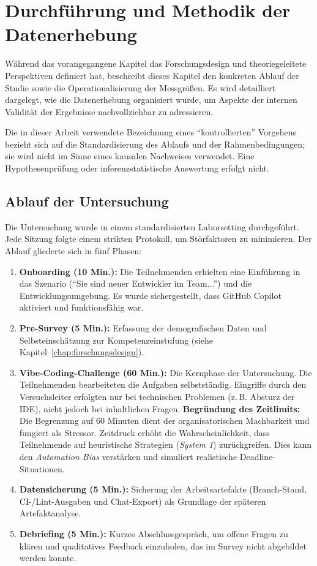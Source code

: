 \chapter{Durchführung und Methodik der Datenerhebung}
\label{chap:methodik}

Während das vorangegangene Kapitel das Forschungsdesign und theoriegeleitete Perspektiven definiert hat, beschreibt dieses Kapitel den konkreten Ablauf der Studie sowie die Operationalisierung der Messgrößen. Es wird detailliert dargelegt, wie die Datenerhebung organisiert wurde, um Aspekte der internen Validität der Ergebnisse nachvollziehbar zu adressieren.

Die in dieser Arbeit verwendete Bezeichnung eines \enquote{kontrollierten} Vorgehens bezieht sich auf die Standardisierung des Ablaufs und der Rahmenbedingungen; sie wird nicht im Sinne eines kausalen Nachweises verwendet. Eine Hypothesenprüfung oder inferenzstatistische Auswertung erfolgt nicht.

\section{Ablauf der Untersuchung}
Die Untersuchung wurde in einem standardisierten Laborsetting durchgeführt. Jede Sitzung folgte einem strikten Protokoll, um Störfaktoren zu minimieren. Der Ablauf gliederte sich in fünf Phasen:

\begin{enumerate}
  \item {\bfseries Onboarding (10 Min.):} Die Teilnehmenden erhielten eine Einführung in das Szenario (\enquote{Sie sind neuer Entwickler im Team...}) und die Entwicklungsumgebung. Es wurde sichergestellt, dass GitHub Copilot aktiviert und funktionsfähig war.

  \item {\bfseries Pre-Survey (5 Min.):} Erfassung der demografischen Daten und Selbsteinschätzung zur Kompetenzeinstufung (siehe Kapitel~\ref{chap:forschungsdesign}).

  \item {\bfseries Vibe-Coding-Challenge (60 Min.):} Die Kernphase der Untersuchung. Die Teilnehmenden bearbeiteten die Aufgaben selbstständig. Eingriffe durch den Versuchsleiter erfolgten nur bei technischen Problemen (z.\,B. Absturz der IDE), nicht jedoch bei inhaltlichen Fragen. {\bfseries Begründung des Zeitlimits:} Die Begrenzung auf 60 Minuten dient der organisatorischen Machbarkeit und fungiert als Stressor. Zeitdruck erhöht die Wahrscheinlichkeit, dass Teilnehmende auf heuristische Strategien (\emph{System 1}) zurückgreifen. Dies kann den \emph{Automation Bias} verstärken und simuliert realistische Deadline-Situationen.

  \item {\bfseries Datensicherung (5 Min.):} Sicherung der Arbeitsartefakte (Branch-Stand, CI-/Lint-Ausgaben und Chat-Export) als Grundlage der späteren Artefaktanalyse.

  \item {\bfseries Debriefing (5 Min.):} Kurzes Abschlussgespräch, um offene Fragen zu klären und qualitatives Feedback einzuholen, das im Survey nicht abgebildet werden konnte.
\end{enumerate}

